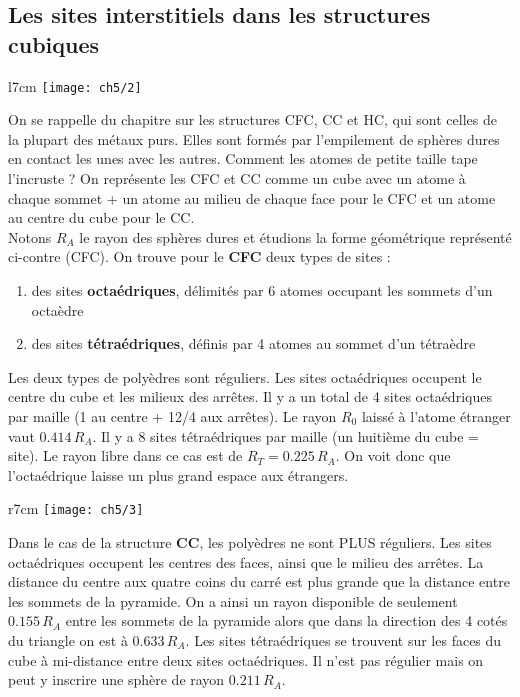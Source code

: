 	\subsection{Les sites interstitiels dans les structures cubiques}
		\begin{wrapfigure}[6]{l}{7cm}
	\vspace{-5mm}
	\texttt{[image: ch5/2]}
	\end{wrapfigure}
	On se rappelle du chapitre sur les structures CFC, CC et HC, qui sont celles de la plupart des métaux purs. Elles sont formés par l'empilement de sphères dures en contact les unes avec les autres. Comment les atomes de petite taille tape l'incruste ? On représente les CFC et CC comme un cube avec un atome à chaque sommet + un atome au milieu de chaque face pour le CFC et un atome au centre du cube pour le CC. \\
	Notons $R_A$ le rayon des sphères dures et étudions la forme géométrique représenté ci-contre (CFC). On trouve pour le \textbf{CFC} deux types de sites : 
	\begin{enumerate}
		\item des sites \textbf{octaédriques}, délimités par 6 atomes occupant les sommets d'un octaèdre
		\item des sites \textbf{tétraédriques}, définis par 4 atomes au sommet d'un tétraèdre
	\end{enumerate}
	Les deux types de polyèdres sont réguliers. Les sites octaédriques occupent le centre du cube et les milieux des arrêtes. Il y a un total de 4 sites octaédriques par maille (1 au centre + 12/4 aux arrêtes). Le rayon $R_0$ laissé à l'atome étranger vaut $0.414\, R_A$. Il y a 8 sites tétraédriques par maille (un huitième du cube = site). Le rayon libre dans ce cas est de $R_T = 0.225\, R_A$. On voit donc que l'octaédrique laisse un plus grand espace aux étrangers. \\
	\begin{wrapfigure}[6]{r}{7cm}
	\vspace{-10mm}
	\texttt{[image: ch5/3]}
	\end{wrapfigure}
	Dans le cas de la structure \textbf{CC}, les polyèdres ne sont PLUS réguliers. Les sites octaédriques occupent les centres des faces, ainsi que le milieu des arrêtes. La distance du centre aux quatre coins du carré est plus grande que la distance entre les sommets de la pyramide. On a ainsi un rayon disponible de seulement $0.155\, R_A$ entre les sommets de la pyramide alors que dans la direction des 4 cotés du triangle on est à $0.633\, R_A$. Les sites tétraédriques se trouvent sur les faces du cube à mi-distance entre deux sites octaédriques. Il n'est pas régulier mais on peut y inscrire une sphère de rayon $0.211\, R_A$.
	
